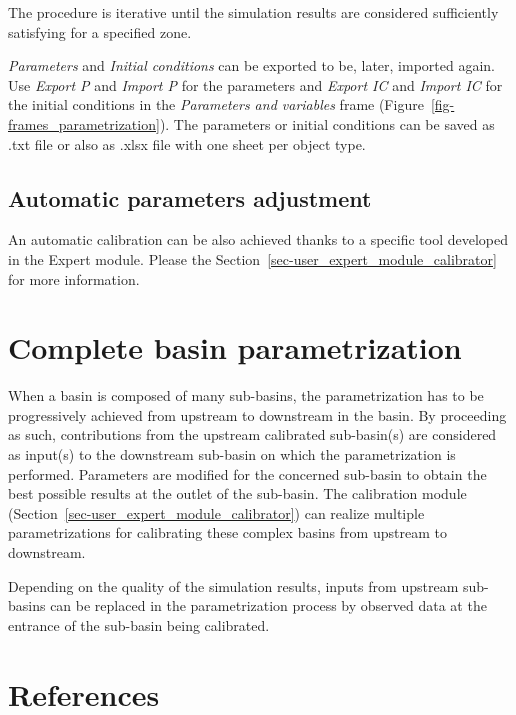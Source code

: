 \documentclass[
  letterpaper,
  DIV=11,
  numbers=noendperiod]{scrreprt}
\begin{document}
The procedure is iterative until the simulation results are considered
sufficiently satisfying for a specified zone.

\emph{Parameters} and \emph{Initial conditions} can be exported to be,
later, imported again. Use \emph{Export P} and \emph{Import P} for the
parameters and \emph{Export IC} and \emph{Import IC} for the initial
conditions in the \emph{Parameters and variables} frame
(Figure~\ref{fig-frames_parametrization}). The parameters or initial
conditions can be saved as .txt file or also as .xlsx file with one
sheet per object type.

\hypertarget{sec-user_rainfall_runoff_auto_param_adjustment}{%
\section{Automatic parameters
adjustment}\label{sec-user_rainfall_runoff_auto_param_adjustment}}

An automatic calibration can be also achieved thanks to a specific tool
developed in the Expert module. Please the
Section~\ref{sec-user_expert_module_calibrator} for more information.

\hypertarget{sec-user_rainfall_runoff_basin_param}{%
\chapter{Complete basin
parametrization}\label{sec-user_rainfall_runoff_basin_param}}

When a basin is composed of many sub-basins, the parametrization has to
be progressively achieved from upstream to downstream in the basin. By
proceeding as such, contributions from the upstream calibrated
sub-basin(s) are considered as input(s) to the downstream sub-basin on
which the parametrization is performed. Parameters are modified for the
concerned sub-basin to obtain the best possible results at the outlet of
the sub-basin. The calibration module
(Section~\ref{sec-user_expert_module_calibrator}) can realize multiple
parametrizations for calibrating these complex basins from upstream to
downstream.

Depending on the quality of the simulation results, inputs from upstream
sub-basins can be replaced in the parametrization process by observed
data at the entrance of the sub-basin being calibrated.

\hypertarget{references-2}{%
\chapter*{References}\label{references-2}}
\end{document}
